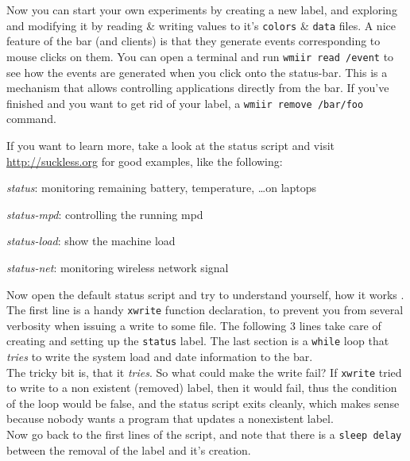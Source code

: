 \documentclass[12pt,a4paper]{article} %
\newcommand{\hrefx}[1]{\href{#1}{#1}} %
\newenvironment{itemize*}
  {\begin{itemize}
      \setlength{\itemsep}{0pt}
      \setlength{\parskip}{0pt}}
  {\end{itemize}}
\begin{document}
    Now you can start your own experiments by creating a new label, and
    exploring and modifying it by reading \& writing values to it's
    \verb+colors+ \& \verb+data+ files.  A nice feature of the bar
    (and clients) is that they generate events corresponding to mouse
    clicks on them.  You can open a terminal and run
    \verb+wmiir read /event+ to see how the events are generated
    when you click onto the status-bar. This is a mechanism that allows
    controlling applications directly from the bar. If you've
    finished and you want to get rid of your label,
    a \verb+wmiir remove /bar/foo+ command.
    
    If you want to learn more, take a look at the status script and 
    visit \hrefx{http://suckless.org} for good examples, like the following:

    \begin{itemize*}
    \item \emph{status}: monitoring remaining battery, temperature, \dots on laptops
    \item \emph{status-mpd}: controlling the running mpd
    \item \emph{status-load}: show the machine load
    \item \emph{status-net}: monitoring wireless network signal
    \end{itemize*}
    
    Now open the default status script and try to understand yourself,
    how it works . The first line is a handy
    \verb+xwrite+ function declaration, to prevent you from several verbosity
    when issuing a write to some file. The following 3 lines take care of
    creating and setting up the \verb+status+ label. The last section is a
    \verb+while+ loop
    that \emph{tries} to write the system load and date information
    to the bar.\\
    
    The tricky bit is, that it \emph{tries}. So what could make the write
    fail? If \verb+xwrite+ tried to write to a non existent (removed)
    label, then it would fail, thus the condition of the loop would be
    false, and the status script exits cleanly, which makes sense
    because nobody wants a program that updates a nonexistent label.\\

    Now go back to the first lines of the script, and note 
    that there is a \verb+sleep delay+ between the removal of the
    label and it's creation.
    
\end{document}
